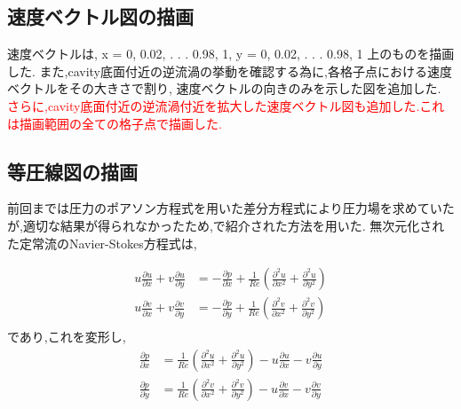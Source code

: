 \documentclass[upLaTeX,a4paper]{jsarticle}
\begin{document}
\subsection{速度ベクトル図の描画}
速度ベクトルは, x = 0, 0.02, . . . 0.98, 1, y = 0, 0.02, . . . 0.98, 1 上のものを描画した.
また,cavity底面付近の逆流渦の挙動を確認する為に,各格子点における速度ベクトルをその大きさで割り,
速度ベクトルの向きのみを示した図を追加した.
\textcolor{red}{
さらに,cavity底面付近の逆流渦付近を拡大した速度ベクトル図も追加した.これは描画範囲の全ての格子点で描画した.
}
\subsection{等圧線図の描画}
前回までは圧力のポアソン方程式を用いた差分方程式により圧力場を求めていたが,適切な結果が得られなかったため,\cite{2}で紹介された方法を用いた.
無次元化された定常流のNavier-Stokes方程式は,

\begin{equation}
  \begin{split}
    u\frac{\partial u}{\partial x} + v\frac{\partial u}{\partial y} & = - \frac{\partial p}{\partial x} + \frac{1}{Re}\left( \frac{\partial^2 u}{\partial x^2} + \frac{\partial^2 u}{\partial y^2} \right) \\
    u\frac{\partial v}{\partial x} + v\frac{\partial v}{\partial y} & = - \frac{\partial p}{\partial y} + \frac{1}{Re}\left( \frac{\partial^2 v}{\partial x^2} + \frac{\partial^2 v}{\partial y^2} \right) \\
  \end{split}
\end{equation}
であり,これを変形し,
\begin{equation}
  \begin{split}
    \frac{\partial p}{\partial x} & = \frac{1}{Re}\left( \frac{\partial^2 u}{\partial x^2} + \frac{\partial^2 u}{\partial y^2} \right) - u\frac{\partial u}{\partial x} - v\frac{\partial u}{\partial y}\\
    \frac{\partial p}{\partial y} & = \frac{1}{Re}\left( \frac{\partial^2 v}{\partial x^2} + \frac{\partial^2 v}{\partial y^2} \right) - u\frac{\partial v}{\partial x} - v\frac{\partial v}{\partial y}\\
  \end{split}
\end{equation}
\end{document}
